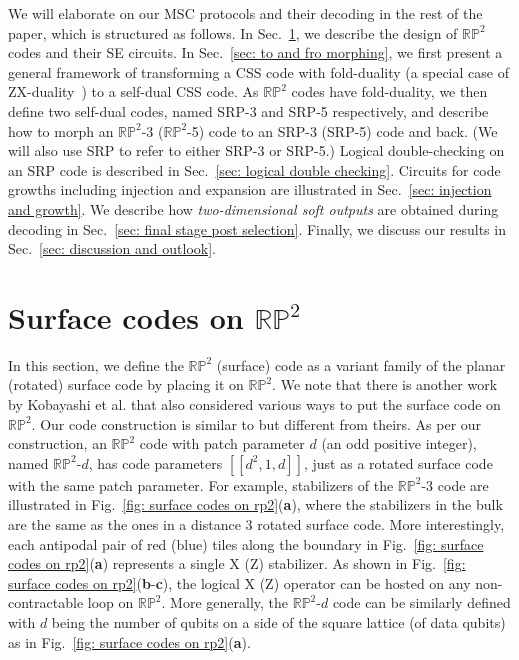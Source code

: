 \documentclass[reprint,aps,twocolumn,superscriptaddress,showpacs,notitlepage,10pt]{revtex4-2}
\theoremstyle{definition}
\begin{document}
We will elaborate on our MSC protocols and their decoding in the rest of the paper, which is structured as follows. In Sec.~\ref{sec: surface codes on rp2}, we describe the design of $\mathbb{RP}^2$ codes and their SE circuits. In Sec.~\ref{sec: to and fro morphing}, we first present a general framework of transforming a CSS code with fold-duality (a special case of ZX-duality~\cite{breuckmann_fold-transversal_2024}) to a self-dual CSS code. As $\mathbb{RP}^2$ codes have fold-duality, we then define two self-dual codes, named SRP-3 and SRP-5 respectively, and describe how to morph an $\mathbb{RP}^2$-3 ($\mathbb{RP}^2$-5) code to an SRP-3 (SRP-5) code and back. (We will also use SRP to refer to either SRP-3 or SRP-5.) Logical double-checking on an SRP code is described in Sec.~\ref{sec: logical double checking}. Circuits for code growths including injection and expansion are illustrated in Sec.~\ref{sec: injection and growth}. We describe how \textit{two-dimensional soft outputs} are obtained during decoding in Sec.~\ref{sec: final stage post selection}. Finally, we discuss our results in Sec.~\ref{sec: discussion and outlook}.  


\section{Surface codes on \texorpdfstring{$\mathbb{RP}^2$}{RP2}}\label{sec: surface codes on rp2}

In this section, we define the $\mathbb{RP}^2$ (surface) code as a variant family of  the planar (rotated) surface code by placing it on $\mathbb{RP}^2$. We note that there is another work~\cite{kobayashi_cross-cap_2024} by Kobayashi et al. that also considered various ways to put the surface code on $\mathbb{RP}^2$. Our code construction is similar to but different from theirs. As per our construction, an $\mathbb{RP}^2$ code with patch parameter $d$ (an odd positive integer), named $\mathbb{RP}^2$-$d$, has code parameters $[[d^2,1,d]]$, just as a rotated surface code with the same patch parameter. For example, stabilizers of the $\mathbb{RP}^2$-$3$ code are illustrated in Fig.~\ref{fig: surface codes on rp2}(\textbf{a}), where the stabilizers in the bulk are the same as the ones in a distance 3 rotated surface code.  More interestingly, each antipodal pair of red (blue) tiles along the boundary in Fig.~\ref{fig: surface codes on rp2}(\textbf{a}) represents a single $\mathrm{X}$ ($\mathrm{Z}$) stabilizer. As shown in Fig.~\ref{fig: surface codes on rp2}(\textbf{b}-\textbf{c}), the logical $\mathrm{X}$ ($\mathrm{Z}$) operator can be hosted on any non-contractable loop on $\mathbb{RP}^2$. More generally, the $\mathbb{RP}^2$-$d$ code can be similarly defined with $d$ being the number of qubits on a side of the square lattice (of data qubits) as in Fig.~\ref{fig: surface codes on rp2}(\textbf{a}).   
\end{document}
